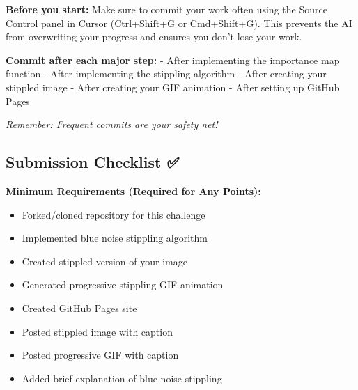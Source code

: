 \documentclass[
  letterpaper,
  DIV=11,
  numbers=noendperiod]{scrartcl}
\providecommand{\tightlist}{%
  \setlength{\itemsep}{0pt}\setlength{\parskip}{0pt}}
\begin{document}
\begin{tcolorbox}[enhanced jigsaw, coltitle=black, breakable, colframe=quarto-callout-warning-color-frame, opacitybacktitle=0.6, colbacktitle=quarto-callout-warning-color!10!white, opacityback=0, toprule=.15mm, bottomtitle=1mm, colback=white, left=2mm, title=\textcolor{quarto-callout-warning-color}{\faExclamationTriangle}\hspace{0.5em}{💾 Important: Save Your Work Frequently!}, toptitle=1mm, rightrule=.15mm, leftrule=.75mm, bottomrule=.15mm, titlerule=0mm, arc=.35mm]

\textbf{Before you start:} Make sure to commit your work often using the
Source Control panel in Cursor (Ctrl+Shift+G or Cmd+Shift+G). This
prevents the AI from overwriting your progress and ensures you don't
lose your work.

\textbf{Commit after each major step:} - After implementing the
importance map function - After implementing the stippling algorithm -
After creating your stippled image - After creating your GIF animation -
After setting up GitHub Pages

\emph{Remember: Frequent commits are your safety net!}

\end{tcolorbox}

\subsection{Submission Checklist ✅}\label{submission-checklist}

\textbf{Minimum Requirements (Required for Any Points):}

\begin{itemize}
\tightlist
\item[$\square$]
  Forked/cloned repository for this challenge
\item[$\square$]
  Implemented blue noise stippling algorithm
\item[$\square$]
  Created stippled version of your image
\item[$\square$]
  Generated progressive stippling GIF animation
\item[$\square$]
  Created GitHub Pages site
\item[$\square$]
  Posted stippled image with caption
\item[$\square$]
  Posted progressive GIF with caption
\item[$\square$]
  Added brief explanation of blue noise stippling
\end{itemize}
\end{document}
